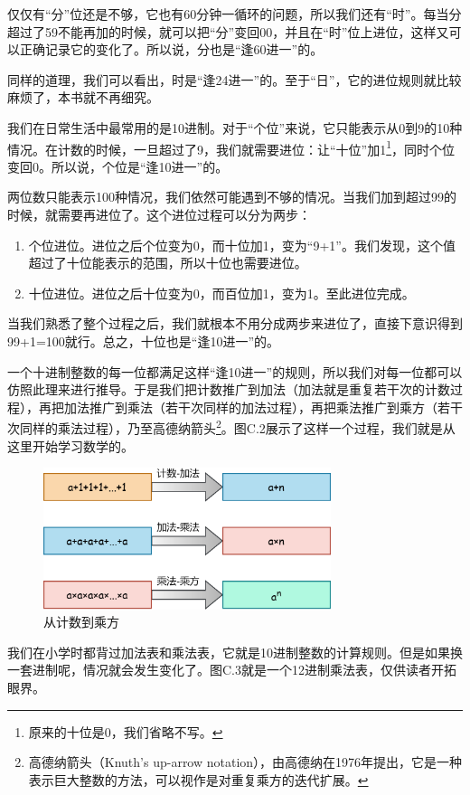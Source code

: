仅仅有``分''位还是不够，它也有60分钟一循环的问题，所以我们还有``时''。每当分超过了59不能再加的时候，就可以把``分''变回00，并且在``时''位上进位，这样又可以正确记录它的变化了。所以说，分也是``逢60进一''的。\par
同样的道理，我们可以看出，时是``逢24进一''的。至于``日''，它的进位规则就比较麻烦了，本书就不再细究。\par
我们在日常生活中最常用的是10进制。对于``个位''来说，它只能表示从0到9的10种情况。在计数的时候，一旦超过了9，我们就需要进位：让``十位''加1\footnote{原来的十位是0，我们省略不写。}，同时个位变回0。所以说，个位是``逢10进一''的。\par
两位数只能表示100种情况，我们依然可能遇到不够的情况。当我们加到超过99的时候，就需要再进位了。这个进位过程可以分为两步：
\begin{enumerate}
    \item 个位进位。进位之后个位变为0，而十位加1，变为``9+1''。我们发现，这个值超过了十位能表示的范围，所以十位也需要进位。
    \item 十位进位。进位之后十位变为0，而百位加1，变为1。至此进位完成。
\end{enumerate}
当我们熟悉了整个过程之后，我们就根本不用分成两步来进位了，直接下意识得到99+1=100就行。总之，十位也是``逢10进一''的。\par
一个十进制整数的每一位都满足这样``逢10进一''的规则，所以我们对每一位都可以仿照此理来进行推导。于是我们把计数推广到加法（加法就是重复若干次的计数过程），再把加法推广到乘法（若干次同样的加法过程），再把乘法推广到乘方（若干次同样的乘法过程），乃至高德纳箭头\footnote{高德纳箭头（Knuth's up-arrow notation），由高德纳在1976年提出，它是一种表示巨大整数的方法，可以视作是对重复乘方的迭代扩展。}。图C.2展示了这样一个过程，我们就是从这里开始学习数学的。\par
\begin{figure}[htbp]
    \centering
    \includegraphics[width=0.75\textwidth]{../images/other_parts/C_from_counting_to_exponentiation_300.png}
    \caption{从计数到乘方}
\end{figure}
我们在小学时都背过加法表和乘法表，它就是10进制整数的计算规则。但是如果换一套进制呢，情况就会发生变化了。图C.3就是一个12进制乘法表，仅供读者开拓眼界。\par

